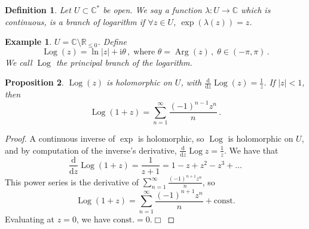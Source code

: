 \documentclass{article}
\theoremstyle{plain}\theoremheaderfont{\normalfont\itshape}\theorembodyfont{\rmfamily}\theoremseparator{.}\newtheorem*{rem}{Remark}\newtheorem*{ex}{Example}\newtheorem*{proof}{Proof}\newtheorem*{altp}{Alternative proof}\newtheorem*{con}{Consequences}\newtheorem*{notn}{Notations}\newtheorem*{cau}{Caution}\newtheorem*{term}{Terminology}\newtheorem*{keyex}{Key example}
\theoremstyle{plain}\theoremheaderfont{\normalfont\bfseries}\theorembodyfont{\rmfamily}\theoremseparator{.}\newtheorem{thm}{Theorem}[section]\newtheorem{lem}[thm]{Lemma}\newtheorem{prop}[thm]{Proposition}\newtheorem*{cor}{Corollary}\newtheorem{defn}[thm]{Definition}\newtheorem{clm}[thm]{Claim}\newtheorem{clminproof}{Claim}\newtheorem{leminproof}{Lemma}\newtheorem{app}{Application}
\theoremstyle{break}\theoremheaderfont{\normalfont\itshape}\theorembodyfont{\rmfamily}\theoremseparator{.\medskip}\newtheorem*{proofskip}{Proof}\newtheorem*{exs}{Examples}\newtheorem*{rems}{Remarks}\newtheorem*{rec}{Recall}\newtheorem*{ppts}{Properties}
\theoremstyle{break}\theoremheaderfont{\normalfont\bfseries}\theorembodyfont{\rmfamily}\theoremseparator{.\medskip}\newtheorem{lemskip}[thm]{Lemma}\newtheorem{defnskip}[thm]{Definition}\newtheorem{propskip}[thm]{Proposition}\newtheorem{thmskip}[thm]{Theorem}
\numberwithin{equation}{section}
\newcommand{\ii}{\mathrm{i}}
\DeclareMathOperator*{\Arg}{Arg}
\DeclareMathOperator*{\Log}{Log}
\newcommand{\qed}{\hfill\ensuremath{\Box}}
\newcommand{\abs}[1]{\left|#1\right|}
\newcommand{\RR}{\mathbb{R}}
\newcommand{\CC}{\mathbb{C}}
\newcommand{\dv}[2]{\frac{\mathrm{d}#1}{\mathrm{d}#2}}
\begin{document}
    \begin{defn}
        Let \(U\subset\CC^*\) be open. We say a function \(\lambda:U\to\CC\) which is continuous, is \textit{a branch of logarithm} if \(\forall z\in U\), \(\exp(\lambda(z))=z\).
    \end{defn}
    \begin{ex}
        \(U=\CC\setminus\RR_{\le 0}\). Define
        \[ \Log(z)=\ln\abs{z}+\ii\theta\,,\;\text{where }\theta=\Arg(z)\,,\;\theta\in(-\pi,\pi)\,.\]
        We call \(\Log\) \textit{the principal branch of the logarithm}. 
    \end{ex}
    \begin{figure}[ht!]
        \centering
    \end{figure}
    \begin{prop}
        \(\Log(z)\) is holomorphic on \(U\), with \(\dv{}{z}\Log(z)=\frac{1}{z}\). If \(\abs{z}<1\), then
        \[\Log(1+z)=\sum_{n=1}^{\infty}\frac{(-1)^{n-1}z^n}{n}\,.\]
    \end{prop}
    \begin{proof}
        A continuous inverse of \(\exp\) is holomorphic, so \(\Log\) is holomorphic on \(U\), and by computation of the inverse's derivative, \(\dv{}{z}\Log z=\frac{1}{z}\). We have that
        \[\dv{}{z}\Log(1+z)=\frac{1}{z+1}=1-z+z^2-z^3+\dots\]
        This power series is the derivative of \(\sum_{n=1}^{\infty}\frac{(-1)^{n+1}z^n}{n}\), so
        \[\Log(1+z)=\sum_{n=1}^{\infty}\frac{(-1)^{n+1}z^n}{n}+\text{const.}\]
        Evaluating at \(z=0\), we have \(\text{const.}=0\).\qed
    \end{proof}
\end{document}
